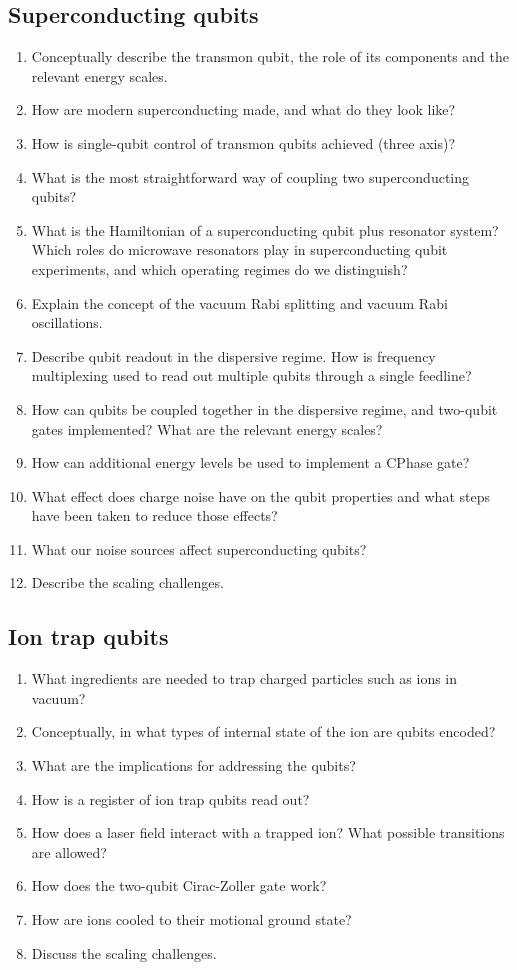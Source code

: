 \documentclass[a4paper]{scrartcl}
\newcommand{\qa}[2]{#1\\ \textit{#2}}
\begin{document}
\subsection*{Superconducting qubits}
\begin{enumerate}
  \item \qa{Conceptually describe the transmon qubit, the role of its components and the relevant energy scales.}{}
  \item \qa{How are modern superconducting made, and what do they look like?}{}
  \item \qa{How is single-qubit control of transmon qubits achieved (three axis)?}{}
  \item \qa{What is the most straightforward way of coupling two superconducting qubits?}{}
  \item \qa{What is the Hamiltonian of a superconducting qubit plus resonator system? Which roles do microwave resonators play in superconducting qubit experiments, and which operating regimes do we distinguish?}{}
  \item \qa{Explain the concept of the vacuum Rabi splitting and vacuum Rabi oscillations. }{}
  \item \qa{Describe qubit readout in the dispersive regime. How is frequency multiplexing used to read out multiple qubits through a single feedline?}{}
  \item \qa{How can qubits be coupled together in the dispersive regime, and two-qubit gates implemented? What are the relevant energy scales?  }{}
  \item \qa{How can additional energy levels be used to implement a CPhase gate?  }{}
  \item \qa{What effect does charge noise have on the qubit properties and what steps have been taken to reduce those effects?}{}
  \item \qa{What our noise sources affect superconducting qubits? }{}
  \item \qa{Describe the scaling challenges.}{}
\end{enumerate}

\subsection*{Ion trap qubits}
\begin{enumerate}
\item \qa{What ingredients are needed to trap charged particles such as ions in vacuum?}{}
\item \qa{Conceptually, in what types of internal state of the ion are qubits encoded?}{}
\item \qa{What are the implications for addressing the qubits?}{}
\item \qa{How is a register of ion trap qubits read out?}{}
\item \qa{How does a laser field interact with a trapped ion? What possible transitions are allowed?}{}
\item \qa{How does the two-qubit Cirac-Zoller gate work?}{}
\item \qa{How are ions cooled to their motional ground state?}{}
\item \qa{Discuss the scaling challenges.}{}
\end{enumerate}
\end{document}
